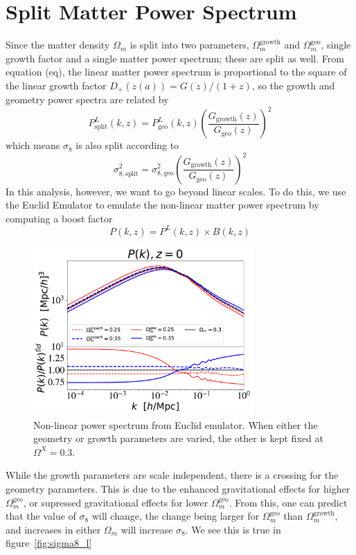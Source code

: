 \section{Split Matter Power Spectrum}
Since the matter density $\Omega_m$ is split into two parameters, $\Omega_m^{\text{growth}}$ and $\Omega_m^{\text{geo}}$, single growth factor and a single matter power spectrum; these are split as well. From equation (eq), the linear matter power spectrum is proportional to the square of the linear growth factor $D_+(z(a)) = G(z)/(1+z)$, so the growth and geometry power spectra are related by
\begin{equation}
	P^L_{\text{split}}(k,z) = P^L_{\text{geo}}(k,z) \left(\frac{G_{\text{growth}}(z)}{G_{\text{geo}}(z)}\right)^2
\end{equation}
which means $\sigma_8$ is also split according to
\begin{equation}
	\sigma_{8,\text{split}}^2 = \sigma_{8,\text{geo}}^2 \left(\frac{G_{\text{growth}}(z)}{G_{\text{geo}}(z)}\right)^2
\end{equation}
In this analysis, however, we want to go beyond linear scales. To do this, we use the Euclid Emulator to emulate the non-linear matter power spectrum by computing a boost factor
\begin{equation}
	P(k,z) = P^L(k,z) \times B(k,z)
\end{equation}
\begin{figure}[ht]
	\centering
	\includegraphics[width=0.75\textwidth]{plots/Pk.pdf}
	\caption{Non-linear power spectrum from Euclid emulator. When either the geometry or growth parameters are varied, the other is kept fixed at $\Omega^X=0.3$.}
	\label{fig:pk}
\end{figure}
While the growth parameters are scale independent, there is a crossing for the geometry parameters. This is due to the enhanced gravitational effects for higher $\Omega_m^{\mathrm{geo}}$, or supressed gravitational effects for lower $\Omega_m^\mathrm{geo}$. From this, one can predict that the value of $\sigma_8$ will change, the change being larger for $\Omega_m^\mathrm{geo}$ than $\Omega_m^\mathrm{growth}$, and increases in either $\Omega_m$ will increase $\sigma_8$. We see this is true in figure~\ref{fig:sigma8_l}
